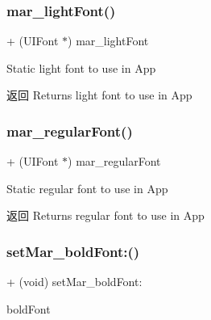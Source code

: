 \subsubsection{\texorpdfstring{mar\+\_\+light\+Font()}{mar\_lightFont()}}
{\footnotesize\ttfamily + (U\+I\+Font $\ast$) mar\+\_\+light\+Font \begin{DoxyParamCaption}{ }\end{DoxyParamCaption}}

Static light font to use in App

\begin{DoxyReturn}{返回}
Returns light font to use in App 
\end{DoxyReturn}
\mbox{\label{category_u_i_font_07_m_a_r_e_x_08_a08a1777c1f548b94d45923916db96d2e}} 
\subsubsection{\texorpdfstring{mar\+\_\+regular\+Font()}{mar\_regularFont()}}
{\footnotesize\ttfamily + (U\+I\+Font $\ast$) mar\+\_\+regular\+Font \begin{DoxyParamCaption}{ }\end{DoxyParamCaption}}

Static regular font to use in App

\begin{DoxyReturn}{返回}
Returns regular font to use in App 
\end{DoxyReturn}
\mbox{\label{category_u_i_font_07_m_a_r_e_x_08_ac8297edb17b16f48d2efd5d9fa770677}} 
\subsubsection{\texorpdfstring{set\+Mar\+\_\+bold\+Font\+:()}{setMar\_boldFont:()}\hspace{0.1cm}{\footnotesize\ttfamily [1/2]}}
{\footnotesize\ttfamily + (void) set\+Mar\+\_\+bold\+Font\+: \begin{DoxyParamCaption}\item[{(U\+I\+Font $\ast$)}]{bold\+Font }\end{DoxyParamCaption}\hspace{0.3cm}{\ttfamily [implementation]}}

